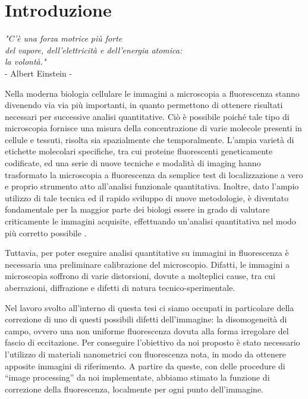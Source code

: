 \clearpage{\pagestyle{empty}\cleardoublepage}

\chapter*{Introduzione} 

\begin{flushright}\begin{small}\textit{"C'è una forza motrice più forte\\ del vapore, dell'elettricità e dell'energia atomica:\\ la volontà."}\\
- Albert Einstein -\\
\end{small}\end{flushright}

Nella moderna biologia cellulare le immagini a microscopia a fluorescenza stanno divenendo via via più importanti, in quanto permettono di ottenere risultati necessari per successive analisi quantitative.
Ciò è possibile poiché tale tipo di microscopia fornisce una misura della concentrazione di varie molecole presenti in cellule e tessuti, risolta sia spazialmente che temporalmente.
L'ampia varietà di etichette molecolari specifiche, tra cui proteine fluorescenti geneticamente codificate, ed una serie di nuove tecniche e modalità di imaging hanno trasformato la microscopia a fluorescenza da semplice test di localizzazione a vero e proprio strumento atto all'analisi funzionale quantitativa.
Inoltre, dato l'ampio utilizzo di tale tecnica ed il rapido sviluppo di nuove metodologie, è diventato fondamentale per la maggior parte dei biologi essere in grado di valutare criticamente le immagini acquisite, effettuando un'analisi quantitativa nel modo più corretto possibile \cite{fluo}.

Tuttavia, per poter eseguire analisi quantitative su immagini in fluorescenza è necessaria una preliminare calibrazione del microscopio.
Difatti, le immagini a microscopia soffrono di varie distorsioni, dovute a molteplici cause, tra cui aberrazioni, diffrazione e difetti di natura tecnico-sperimentale.

Nel lavoro svolto all'interno di questa tesi ci siamo occupati in particolare della correzione di uno di questi possibili difetti dell'immagine: la disomogeneità di campo, ovvero una non uniforme fluorescenza dovuta alla forma irregolare del fascio di eccitazione. 
Per conseguire l'obiettivo da noi proposto è stato necessario l'utilizzo di materiali nanometrici con fluorescenza nota, in modo da ottenere apposite immagini di riferimento. 
A partire da queste, con delle procedure di ``image processing'' da noi implementate, abbiamo stimato la funzione di correzione della fluorescenza, localmente per ogni punto dell'immagine.

